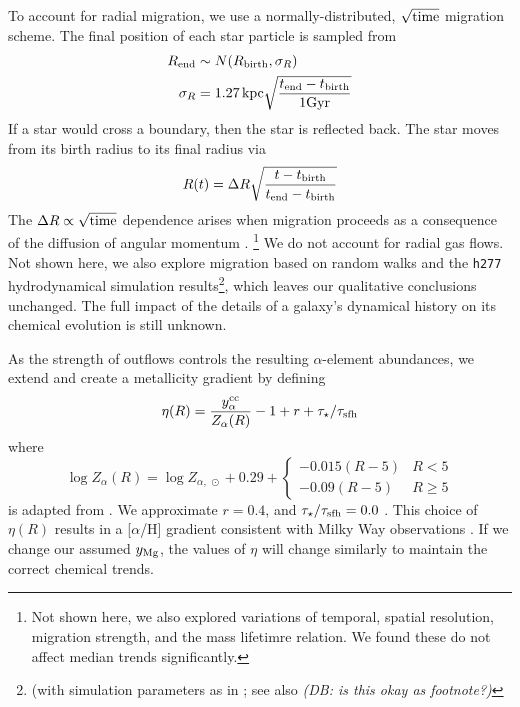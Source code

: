 \documentclass[fleqn,
usenatbib]{mnras}
\newcommand{\JJ}{\citetalias{james+21}}
\newcommand{\dbnote}[1]{ {\color{Thistle} \textit{\small (DB: #1)}} }
\begin{document}
To account for radial migration, we use a normally-distributed, $\sqrt{\rm time}$ migration scheme. The final position of each star particle is sampled from
\begin{subequations}
\begin{align}
        R_{\rm end} &\sim N(R_{\rm birth}, \sigma_R ) \\
        \sigma_{R} &= 1.27\,{\rm kpc} \sqrt{\frac{t_{\rm end} - t_{\rm birth}}{1 \rm Gyr}}
\end{align}
\end{subequations}
If a star would cross a boundary, then the star is reflected back.
The star moves from its birth radius to its final radius via
\begin{equation}
        R(t) = \Delta R \sqrt{\frac{t - t_{\rm birth}}{t_{\rm end} - t_{\rm birth}}}
\end{equation}
The $\Delta R \propto \sqrt{\rm time}$ dependence arises when migration proceeds as a consequence of the diffusion of angular momentum \citep{frankel18, frankel20}.
\footnote{Not shown here, we also explored variations of temporal, spatial resolution, migration strength, and the mass lifetimre relation. We found these do not affect median trends significantly.}
We do not account for radial gas flows.
Not shown here, we also explore migration based on random walks and the \texttt{h277} hydrodynamical
simulation results\footnote{(with simulation parameters as in \citealt{bird+21}; see also \citealt{christensen12, zolotov12, loebman12, BZ14} \dbnote{is this okay as footnote?} }, which leaves our qualitative conclusions unchanged. 
The full impact of the details of a galaxy's dynamical history on its chemical evolution is still unknown.

As the strength of outflows controls the resulting $\alpha$-element abundances, we extend \JJ and create a metallicity gradient by defining
\begin{equation}\label{eq:mass_loading}
\eta(R) = \frac{y_{\alpha}^{\rm cc}}{Z_{\alpha}(R)} -1 + r + \tau_{\star} / \tau_{\rm sfh} 
\end{equation}
where 
\begin{equation}
    \log Z_{\alpha}(R) = \log Z_{\alpha,\ \odot} + 
    0.29 + 
    \begin{cases}
        -0.015(R-5) & R < 5 \\
        -0.09(R-5) & R \geq 5
    \end{cases}
\end{equation}
is adapted from \citet{hayden+14}.  We approximate $r=0.4$, and $\tau_\star/\tau_{\rm sfh} = 0.0$ .
This choice of $\eta(R)$ results in a [$\alpha$/H] gradient consistent with Milky Way observations \citep[e.g.][]{hayden+14, weinberg+19, frinchaboy+13}.
If we change our assumed $y_{\rm Mg}$, the values of $\eta$ will change similarly to maintain the correct chemical trends.
\end{document}
